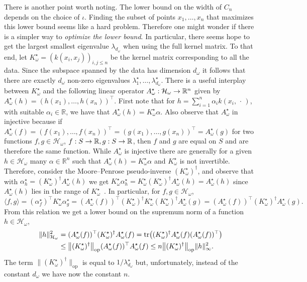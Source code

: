 \documentclass[10pt]{amsart}
\theoremstyle{definition}\newtheorem{defi}[theo]{Definition}\newtheorem{rema}[theo]{Remark}\newtheorem{exam}[theo]{Example}\newtheorem{exem}[theo]{Example}\newtheorem{nota}[theo]{Notation}
\theoremstyle{remark}
\DeclareMathOperator{\opp}{op}
\DeclareMathOperator{\tr}{tr}
\newcommand{\R}{\mathbb{R}}
\newcommand{\cH}{\mathcal{H}}
\newcommand*{\MK}{\mkern 2mu}
\renewcommand*{\to}{\mathchoice{\longrightarrow}{\rightarrow}{\rightarrow}{\rightarrow}}
\let\originalleft\left
\let\originalright\right
\renewcommand{\left}{\mathopen{}\mathclose\bgroup\originalleft}
\renewcommand{\right}{\aftergroup\egroup\originalright}
\begin{document}
There is another point worth noting. The lower bound on the width of $C_n$ depends on the choice of $\iota$. Finding the subset of points $x_1,\dots, x_n$ that maximizes this lower bound seems like a hard problem. Therefore one might wonder if there is a simpler way to \emph{optimize the lower bound}. In particular, there seems hope to get the largest smallest eigenvalue $\lambda_{d_\omega}$ when using the full kernel matrix. To that end, let $K^\star_\omega = (k(x_i,x_j))_{i,j \leq n}$ be the kernel matrix corresponding to all the data. Since the subspace spanned by the data has dimension $d_\omega$ it follows that there are exactly $d_\omega$ non-zero eigenvalues $\lambda_1^\star,\dots, \lambda^\star_{d_\omega}$. There is a useful interplay between $K_\omega^\star$ and the following linear operator $A_\omega^\star :\cH_\omega \to \R^n$ given by $A_\omega^\star(h) = (h(x_1),\dots, h(x_n))^\top$. First note that for $h= \sum_{i=1}^n \alpha_i k(x_i,\,\cdot\,)$, with suitable $\alpha_i \in \R$, we have that $A^\star_\omega(h) = K_\omega^\star \alpha$. Also observe that $A_\omega^\star$ in injective because if $A_\omega^\star(f) = (f(x_1), \dots, f(x_n))^\top = (g(x_1),\dots, g(x_n))^\top = A_\omega^\star(g)$ for two functions $f,g \in \cH_\omega$, $f: S\to \R, g:S \to \R$, then $f$ and $g$ are equal on $S$ and are therefore the same function. While $A_\omega^\star$ is injective there are generally for a given $h\in \cH_\omega$ many $\alpha \in \R^n$ such that $A_\omega^\star(h) = K_\omega^\star \alpha$ and $K_\omega^\star$ is not invertible. Therefore, consider the Moore--Penrose pseudo-inverse $(K_\omega^\star)^\dagger$, and observe that with $\alpha_h^\star = (K_\omega^\star)^\dagger A_\omega^\star(h)$ we get $K_\omega^\star \alpha_h^\star = K_\omega^\star (K_\omega^\star)^\dagger A_\omega^\star(h) = A_\omega^\star(h)$ since $A_\omega^\star(h)$ lies in the range of $K_\omega^\star$~\cite[Definition~1.1.2$\MK$(a)]{CAMP09}. In particular, for $f,g \in \cH_\omega$,
\[
\langle f,g \rangle = (\alpha^\star_f)^\top K_\omega^\star \alpha_g^\star = (A_\omega^\star(f))^\top (K_\omega^\star)^\dagger K_\omega^\star (K_\omega^\star)^\dagger A_\omega^\star(g) = (A_\omega^\star(f))^\top (K_\omega^\star)^\dagger A_\omega^\star(g).
\]
From this relation we get a lower bound on the supremum norm of a function $h
\in \cH_\omega$,
\begin{align*}
\|h\|_{\cH_\omega}^2 &= (A_\omega^\star(f))^\top (K_\omega^\star)^\dagger A_\omega^\star(f) = \tr\left((K_\omega^\star)^\dagger A_\omega^\star(f) (A_\omega^\star(f))^\top\right) \\
&\leq \left\| (K_\omega^\star)^\dagger\right\|_{\opp} (A_\omega^\star(f))^\top A_\omega^\star(f)
\leq n \left\| (K_\omega^\star)^\dagger\right\|_{\opp} \|h\|_\infty^2.
\end{align*}
The term $\|(K_\omega^\star)^\dagger\|_{\opp}$ is equal to $1/\lambda_{d_\omega}^\star$ but, unfortunately, instead of the constant $d_\omega$ we have now the constant $n$.
\end{document}
